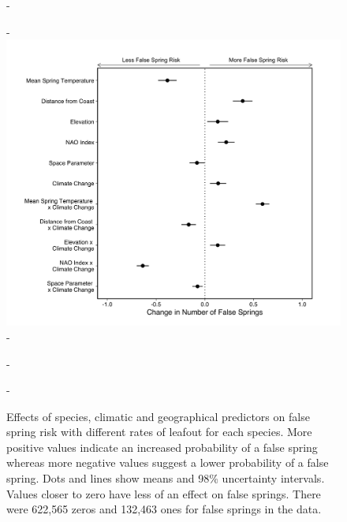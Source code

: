 \documentclass{article}\usepackage[]{graphicx}\usepackage[]{color}
\begin{document}
  {\begin{figure} [H]
  -\begin{center}
  -\includegraphics[width=12cm]{..//analyses/figures/model_output_98_dvr.png}
  -\caption{Effects of species, climatic and geographical predictors on false spring risk with different rates of leafout for each species. More positive values indicate an increased probability of a false spring whereas more negative values suggest a lower probability of a false spring. Dots and lines show means and 98\% uncertainty intervals. Values closer to zero have less of an effect on false springs. There were 622,565 zeros and 132,463 ones for false springs in the data.}\label{fig:dvr}
  -\end{center}
  -\end{figure}}
  
\end{document}
